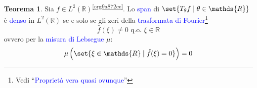 \documentclass[10pt]{book}
\newcommand{\1}{\mathds{1}}
\newcommand{\R}{\mathds{R}}
\theoremstyle{definition}%
\newtheorem{thm}{Teorema}[section]
\theoremstyle{plain}
\theoremstyle{remark}
\renewcommand{\href}[2]{\textcolor{blue}{#2}}
\begin{document}
\begin{thm}
Sia \(f \in L^{2}(\R)\)\textsuperscript{\ref{org9a872ce}}. Lo \href{../../../../../org/roam/20250630122400-span.org}{span} di \(\set{T_{\theta}f\mid \theta \in \R}\) è \href{../../../../../org/roam/20250301193045-sottoinsieme_denso.org}{denso} in \(L^{2}(\R)\) se e solo se gli zeri della \href{../../../../../org/roam/20250630121906-trasformata_di_fourier.org}{trasformata di Fourier}\footnote{Vedi ``\href{../../../../../org/roam/20250630122745-proprieta_vera_quasi_ovunque.org}{Proprietà vera quasi ovunque}''}
\begin{equation*}
\hat{f}(\xi) \neq 0\text{ q.o. }\xi \in \R
\end{equation*}
ovvero per la \href{../../../../../org/roam/20250630122824-misura_di_lebesgue.org}{misura di Lebsegue} \(\mu\):
\begin{equation*}
\mu\left(\set{\xi \in \R\mid \hat{f}(\xi) = 0}\right) = 0
\end{equation*}
\label{teo:wt2}
\end{thm}
\end{document}

